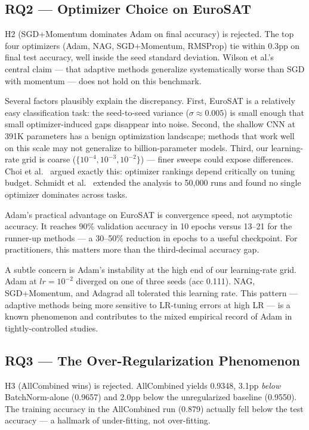 \documentclass[10pt,letterpaper]{article}
\begin{document}
\subsection{RQ2 --- Optimizer Choice on EuroSAT}
H2 (SGD+Momentum dominates Adam on final accuracy) is rejected. The top four optimizers (Adam, NAG, SGD+Momentum, RMSProp) tie within 0.3pp on final test accuracy, well inside the seed standard deviation. Wilson et al.'s~\cite{wilson2017} central claim --- that adaptive methods generalize systematically worse than SGD with momentum --- does not hold on this benchmark.

Several factors plausibly explain the discrepancy. First, EuroSAT is a relatively easy classification task: the seed-to-seed variance ($\sigma \approx 0.005$) is small enough that small optimizer-induced gaps disappear into noise. Second, the shallow CNN at 391K parameters has a benign optimization landscape; methods that work well on this scale may not generalize to billion-parameter models. Third, our learning-rate grid is coarse ($\{10^{-4}, 10^{-3}, 10^{-2}\}$) --- finer sweeps could expose differences. Choi et al.~\cite{choi2019} argued exactly this: optimizer rankings depend critically on tuning budget. Schmidt et al.~\cite{schmidt2021} extended the analysis to 50{,}000 runs and found no single optimizer dominates across tasks.

Adam's practical advantage on EuroSAT is convergence speed, not asymptotic accuracy. It reaches 90\% validation accuracy in 10 epochs versus 13--21 for the runner-up methods --- a 30--50\% reduction in epochs to a useful checkpoint. For practitioners, this matters more than the third-decimal accuracy gap.

A subtle concern is Adam's instability at the high end of our learning-rate grid. Adam at $lr{=}10^{-2}$ diverged on one of three seeds (acc 0.111). NAG, SGD+Momentum, and Adagrad all tolerated this learning rate. This pattern --- adaptive methods being more sensitive to LR-tuning errors at high LR --- is a known phenomenon and contributes to the mixed empirical record of Adam in tightly-controlled studies.

\subsection{RQ3 --- The Over-Regularization Phenomenon}
H3 (AllCombined wins) is rejected. AllCombined yields 0.9348, 3.1pp \emph{below} BatchNorm-alone (0.9657) and 2.0pp below the unregularized baseline (0.9550). The training accuracy in the AllCombined run (0.879) actually fell below the test accuracy --- a hallmark of under-fitting, not over-fitting.
\end{document}
